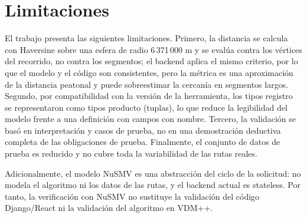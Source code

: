 \section{Limitaciones}
\label{sec:limitaciones}

El trabajo presenta las siguientes limitaciones. Primero, la distancia se
calcula con Haversine sobre una esfera de radio 6\,371\,000 m y se evalúa
contra los vértices del recorrido, no contra los segmentos; el backend
aplica el mismo criterio, por lo que el modelo y el código son
consistentes, pero la métrica es una aproximación de la distancia
peatonal y puede sobreestimar la cercanía en segmentos largos. Segundo,
por compatibilidad con la versión de la herramienta, los tipos registro
se representaron como tipos producto (tuplas), lo que reduce la
legibilidad del modelo frente a una definición con campos con nombre.
Tercero, la validación se basó en interpretación y casos de prueba, no en
una demostración deductiva completa de las obligaciones de prueba.
Finalmente, el conjunto de datos de prueba es reducido y no cubre toda la
variabilidad de las rutas reales.

Adicionalmente, el modelo NuSMV es una abstracción del ciclo de la
solicitud: no modela el algoritmo ni los datos de las rutas, y el backend
actual es stateless. Por tanto, la verificación con NuSMV no sustituye la
validación del código Django/React ni la validación del algoritmo en
VDM++.

